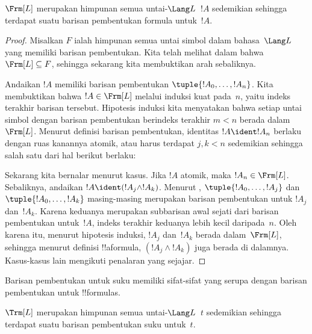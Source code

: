 \documentclass[../../../include/open-logic-section]{subfiles}
\begin{document}
\begin{thm}
$\Frm[L]$ merupakan himpunan semua untai-$\Lang L$~$!A$ sedemikian sehingga
terdapat suatu barisan pembentukan formula untuk~$!A$.
\end{thm}

\begin{proof}
Misalkan $F$ ialah himpunan semua untai simbol dalam bahasa~$\Lang L$ yang
memiliki barisan pembentukan. Kita telah melihat dalam
 bahwa $\Frm[L] \subseteq F$, sehingga
sekarang kita membuktikan arah sebaliknya.

Andaikan $!A$ memiliki barisan pembentukan $\tuple{!A_0,\dotsc,!A_n}$. Kita
membuktikan bahwa $!A \in \Frm[L]$ melalui induksi kuat pada~$n$, yaitu
indeks terakhir barisan tersebut. Hipotesis induksi kita menyatakan bahwa
setiap untai simbol dengan barisan pembentukan berindeks terakhir $m < n$
berada dalam~$\Frm[L]$. Menurut definisi barisan pembentukan, identitas
$!A \ident !A_n$ berlaku dengan ruas kanannya atomik, atau harus terdapat
$j,k < n$ sedemikian sehingga salah satu dari hal berikut berlaku:
\begin{enumerate}
\end{enumerate}
Sekarang kita bernalar menurut kasus. Jika $!A$ atomik, maka
$!A_n \in \Frm[L]$. Sebaliknya, andaikan $!A \ident
(!A_j \land !A_k)$. Menurut ,
$\tuple{!A_0,\dotsc,!A_j}$ dan $\tuple{!A_0,\dotsc,!A_k}$ masing-masing
merupakan barisan pembentukan untuk $!A_j$ dan~$!A_k$. Karena keduanya
merupakan subbarisan awal sejati dari barisan pembentukan untuk~$!A$, indeks
terakhir keduanya lebih kecil daripada~$n$. Oleh karena itu, menurut
hipotesis induksi, $!A_j$ dan~$!A_k$ berada dalam~$\Frm[L]$, sehingga
menurut definisi !!a{formula}, $(!A_j \land !A_k)$ juga berada di dalamnya.
Kasus-kasus lain mengikuti penalaran yang sejajar.
\end{proof}

Barisan pembentukan untuk suku memiliki sifat-sifat yang serupa dengan
barisan pembentukan untuk !!{formula}s.

\begin{prop}
$\Trm[L]$ merupakan himpunan semua untai-$\Lang L$~$t$ sedemikian sehingga
terdapat suatu barisan pembentukan suku untuk~$t$.
\end{prop}
\end{document}
